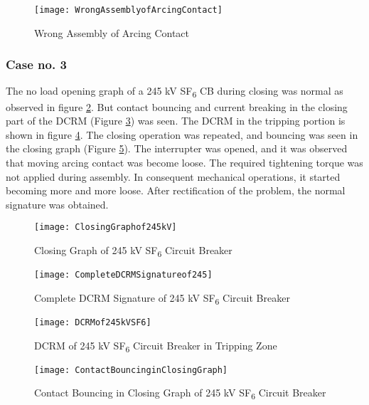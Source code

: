 \begin{figure}[!htbp]
    \centering
    \texttt{[image: WrongAssemblyofArcingContact]}
    \caption{Wrong Assembly of Arcing Contact}
    \label{fig:Wrong Assembly of Arcing Contact}
\end{figure}

\subsubsection*{Case no. 3}
The no load opening graph of a 245 kV SF\textsubscript{6} CB during closing was normal as observed in figure \ref{fig:Closing Graph of 245 kV SF6 Circuit Breaker}. But contact bouncing and current breaking in the closing part of the DCRM (Figure \ref{fig:Complete DCRM Signature of 245 kV SF6 Circuit Breaker}) was seen. The DCRM in the tripping portion is shown in figure \ref{fig:DCRM of 245 kV SF6 Circuit Breaker in Tripping Zone}. The closing operation was repeated, and bouncing was seen in the closing graph (Figure \ref{fig:Contact Bouncing in Closing Graph of 245 kV SF6 Circuit Breaker}). The interrupter was opened, and it was observed that moving arcing contact was become loose. The required tightening torque was not applied during assembly. In consequent mechanical operations, it started becoming more and more loose. After rectification of the problem, the normal signature was obtained.

\begin{figure}[!htbp]
    \centering
    \texttt{[image: ClosingGraphof245kV]}
    \caption{Closing Graph of 245 kV SF\textsubscript{6} Circuit Breaker}
    \label{fig:Closing Graph of 245 kV SF6 Circuit Breaker}
\end{figure}

\begin{figure}[!htbp]
    \centering
    \texttt{[image: CompleteDCRMSignatureof245]}
    \caption{Complete DCRM Signature of 245 kV SF\textsubscript{6} Circuit Breaker}
    \label{fig:Complete DCRM Signature of 245 kV SF6 Circuit Breaker}
\end{figure}

\begin{figure}[!htbp]
    \centering
    \texttt{[image: DCRMof245kVSF6]}
    \caption{DCRM of 245 kV SF\textsubscript{6} Circuit Breaker in Tripping Zone }
    \label{fig:DCRM of 245 kV SF6 Circuit Breaker in Tripping Zone}
\end{figure}

\begin{figure}[!htbp]
    \centering
    \texttt{[image: ContactBouncinginClosingGraph]}
    \caption{Contact Bouncing in Closing Graph of 245 kV SF\textsubscript{6} Circuit Breaker}
    \label{fig:Contact Bouncing in Closing Graph of 245 kV SF6 Circuit Breaker}
\end{figure}
\clearpage

